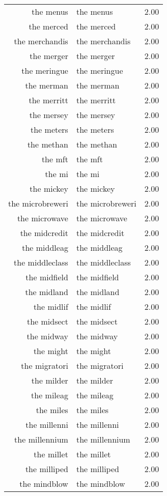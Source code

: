 \begin{table}[ht]
\begin{tabular}{rlr}
  the menus & the menus & 2.00 \\ 
  the merced & the merced & 2.00 \\ 
  the merchandis & the merchandis & 2.00 \\ 
  the merger & the merger & 2.00 \\ 
  the meringue & the meringue & 2.00 \\ 
  the merman & the merman & 2.00 \\ 
  the merritt & the merritt & 2.00 \\ 
  the mersey & the mersey & 2.00 \\ 
  the meters & the meters & 2.00 \\ 
  the methan & the methan & 2.00 \\ 
  the mft & the mft & 2.00 \\ 
  the mi & the mi & 2.00 \\ 
  the mickey & the mickey & 2.00 \\ 
  the microbreweri & the microbreweri & 2.00 \\ 
  the microwave & the microwave & 2.00 \\ 
  the midcredit & the midcredit & 2.00 \\ 
  the middleag & the middleag & 2.00 \\ 
  the middleclass & the middleclass & 2.00 \\ 
  the midfield & the midfield & 2.00 \\ 
  the midland & the midland & 2.00 \\ 
  the midlif & the midlif & 2.00 \\ 
  the midsect & the midsect & 2.00 \\ 
  the midway & the midway & 2.00 \\ 
  the might & the might & 2.00 \\ 
  the migratori & the migratori & 2.00 \\ 
  the milder & the milder & 2.00 \\ 
  the mileag & the mileag & 2.00 \\ 
  the miles & the miles & 2.00 \\ 
  the millenni & the millenni & 2.00 \\ 
  the millennium & the millennium & 2.00 \\ 
  the millet & the millet & 2.00 \\ 
  the milliped & the milliped & 2.00 \\ 
  the mindblow & the mindblow & 2.00 \\ 

\end{tabular}
\end{table}
